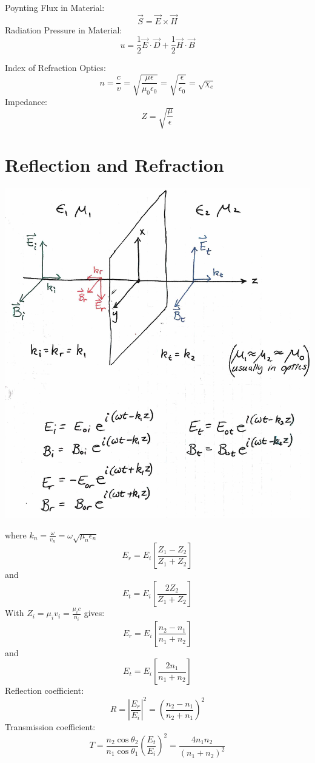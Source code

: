 \documentclass[12pt]{article}
\begin{document}
\noindent Poynting Flux in Material:
\[\vec{S}=\vec{E}\times\vec{H}\]
Radiation Pressure in Material:
\[u=\frac{1}{2}\vec{E}\cdot\vec{D}+\frac{1}{2}\vec{H}\cdot\vec{B}\]

\noindent Index of Refraction Optics:
\[n=\frac{c}{v}=\sqrt{\frac{\mu\epsilon}{\mu_0\epsilon_0}}=\sqrt{\frac{\epsilon}{\epsilon_0}}=\sqrt{\chi_e}\]
Impedance:
\[Z=\sqrt{\frac{\mu}{\epsilon}}\]

\section{Reflection and Refraction}
\begin{center}
    \includegraphics[width=\textwidth]{EandB.png}
\end{center}
where $k_n=\frac{\omega}{v_n}=\omega\sqrt{\mu_n\epsilon_n}$
\[E_r=E_i\left[ \frac{Z_1-Z_2}{Z_1+Z_2}  \right]\] and \[ E_t = E_i \left[ \frac{2Z_2}{Z_1+Z_2} \right]\]
With $Z_i=\mu_i v_i = \frac{\mu_i c}{n_i}$ gives:
\[E_r=E_i\left[ \frac{n_2-n_1}{n_1+n_2}  \right]\] and \[ E_t = E_i \left[ \frac{2n_1}{n_1+n_2} \right]\]
Reflection coefficient:
\[R=\left\vert\frac{E_r}{E_i}\right\vert^2=\left( \frac{n_2-n_1}{n_2+n_1} \right)^2\]
Transmission coefficient:
\[T=\frac{n_2\cos\theta_2}{n_1\cos\theta_1}\left( \frac{E_t}{E_i} \right)^2=\frac{4n_1n_2}{(n_1+n_2)^2}\]
\end{document}
